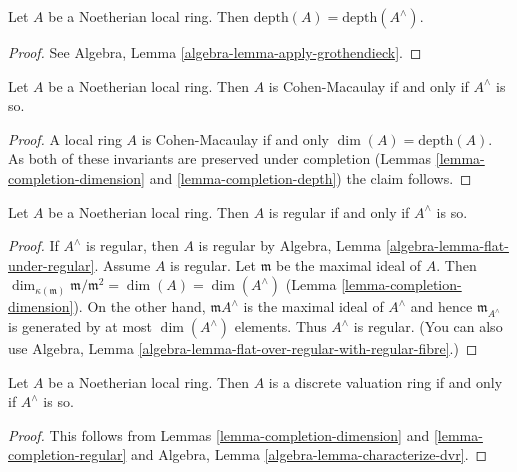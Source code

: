 \begin{lemma}
\label{lemma-completion-depth}
Let $A$ be a Noetherian local ring. Then
$\text{depth}(A) = \text{depth}(A^\wedge)$.
\end{lemma}

\begin{proof}
See Algebra, Lemma \ref{algebra-lemma-apply-grothendieck}.
\end{proof}

\begin{lemma}
\label{lemma-completion-CM}
Let $A$ be a Noetherian local ring.
Then $A$ is Cohen-Macaulay if and only if $A^\wedge$ is so.
\end{lemma}

\begin{proof}
A local ring $A$ is Cohen-Macaulay if and only $\dim(A) = \text{depth}(A)$.
As both of these invariants are preserved under completion
(Lemmas \ref{lemma-completion-dimension} and \ref{lemma-completion-depth})
the claim follows.
\end{proof}

\begin{lemma}
\label{lemma-completion-regular}
Let $A$ be a Noetherian local ring.
Then $A$ is regular if and only if $A^\wedge$ is so.
\end{lemma}

\begin{proof}
If $A^\wedge$ is regular, then $A$ is regular by
Algebra, Lemma \ref{algebra-lemma-flat-under-regular}.
Assume $A$ is regular. Let $\mathfrak m$ be the maximal ideal
of $A$. Then $\dim_{\kappa(\mathfrak m)} \mathfrak m/\mathfrak m^2 =
\dim(A) = \dim(A^\wedge)$ (Lemma \ref{lemma-completion-dimension}).
On the other hand, $\mathfrak mA^\wedge$ is the maximal ideal of
$A^\wedge$ and hence $\mathfrak m_{A^\wedge}$
is generated by at most $\dim(A^\wedge)$ elements. Thus $A^\wedge$ is regular.
(You can also use
Algebra, Lemma \ref{algebra-lemma-flat-over-regular-with-regular-fibre}.)
\end{proof}

\begin{lemma}
\label{lemma-completion-dvr}
Let $A$ be a Noetherian local ring.
Then $A$ is a discrete valuation ring if and only if $A^\wedge$ is so.
\end{lemma}

\begin{proof}
This follows from Lemmas \ref{lemma-completion-dimension} and
\ref{lemma-completion-regular} and
Algebra, Lemma \ref{algebra-lemma-characterize-dvr}.
\end{proof}

